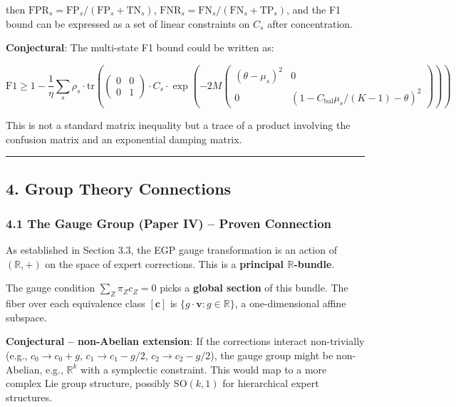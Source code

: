 \documentclass[
  12pt,
]{ctexart}
\begin{document}
then \(\text{FPR}_s = \text{FP}_s/(\text{FP}_s + \text{TN}_s)\),
\(\text{FNR}_s = \text{FN}_s/(\text{FN}_s + \text{TP}_s)\), and the F1
bound can be expressed as a set of linear constraints on \(C_s\) after
concentration.

\textbf{Conjectural}: The multi-state F1 bound could be written as:

\[\text{F1} \geq 1 - \frac{1}{\eta} \sum_s \rho_s \cdot \text{tr}\left( \begin{pmatrix} 0 & 0 \\ 0 & 1 \end{pmatrix} \cdot C_s \cdot \exp\left(-2M \begin{pmatrix} (\theta - \mu_s)^2 & 0 \\ 0 & (1 - C_{\text{bal}}\mu_s/(K-1) - \theta)^2 \end{pmatrix}\right) \right)\]

This is not a standard matrix inequality but a trace of a product
involving the confusion matrix and an exponential damping matrix.

\begin{center}\rule{0.5\linewidth}{0.5pt}\end{center}

\subsection{4. Group Theory Connections}\label{group-theory-connections}

\subsubsection{4.1 The Gauge Group (Paper IV) -- Proven
Connection}\label{the-gauge-group-paper-iv-proven-connection}

As established in Section 3.3, the EGP gauge transformation is an action
of \((\mathbb{R}, +)\) on the space of expert corrections. This is a
\textbf{principal \(\mathbb{R}\)-bundle}.

The gauge condition \(\sum_Z \pi_Z c_Z = 0\) picks a \textbf{global
section} of this bundle. The fiber over each equivalence class
\([\mathbf{c}]\) is \(\{g \cdot \mathbf{v} : g \in \mathbb{R}\}\), a
one-dimensional affine subspace.

\textbf{Conjectural -- non-Abelian extension}: If the corrections
interact non-trivially (e.g., \(c_0 \to c_0 + g\),
\(c_1 \to c_1 - g/2\), \(c_2 \to c_2 - g/2\)), the gauge group might be
non-Abelian, e.g., \(\mathbb{R}^k\) with a symplectic constraint. This
would map to a more complex Lie group structure, possibly
\(\text{SO}(k, 1)\) for hierarchical expert structures.
\end{document}

